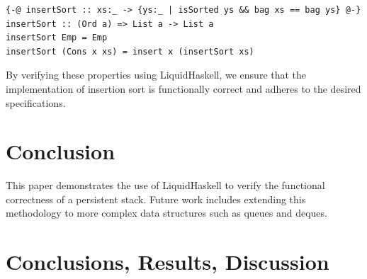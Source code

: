 \documentclass[]{rptuseminar}
\begin{document}
\begin{lstlisting}[caption=Insertion Sort Proof]
{-@ insertSort :: xs:_ -> {ys:_ | isSorted ys && bag xs == bag ys} @-}
insertSort :: (Ord a) => List a -> List a
insertSort Emp = Emp
insertSort (Cons x xs) = insert x (insertSort xs)
\end{lstlisting}

By verifying these properties using LiquidHaskell, we ensure that the implementation of insertion sort is functionally correct and adheres to the desired specifications.

\section{Conclusion}
This paper demonstrates the use of LiquidHaskell to verify the functional correctness of a persistent stack. Future work includes extending this methodology to more complex data structures such as queues and deques.
\label{sec:example}

\section{Conclusions, Results, Discussion}
\label{sec:conclusions}

\newpage
\nocite{*}



\end{document}
